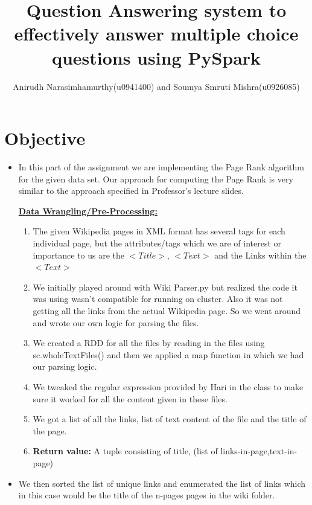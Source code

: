 \documentclass[11pt]{article}
\title{\textbf{{Question Answering system to effectively answer multiple choice questions using PySpark}}}
\author{Anirudh Narasimhamurthy(u0941400) and Soumya Smruti Mishra(u0926085)}
\begin{document}
\maketitle
\section{Objective}



\begin{itemize}

\item[] In this part of the assignment we are implementing the Page Rank algorithm for the given data set. Our approach for computing the Page Rank is very similar to the approach specified in Professor's lecture slides.

\textbf{\underline{Data Wrangling/Pre-Processing:}}

\begin {enumerate}

\item The given Wikipedia pages in XML format has several tags for each individual page, but the attributes/tags which we are of interest or importance to us are the $<Title>$, $<Text>$ and the Links within the $<Text>$
 
\item We initially played around with Wiki Parser.py but realized the code it was using wasn't compatible for running on cluster. Also it was not getting all the links from the actual Wikipedia page. So we went around and wrote our own logic for parsing the files.

\item We created a RDD for all the files by reading in the files using sc.wholeTextFiles() and then we applied a map function in which we had our parsing logic.

\item We tweaked the regular expression provided by Hari in the class to make sure it worked for all the content given in these files.

\item We got a list of all the links, list of text content of the file and the title of the page. 

\item\textbf{Return value:} A tuple consisting of  title, (list of links-in-page,text-in-page)

\end{enumerate}

\item We then sorted the list of unique links and enumerated the list of links which in this case would be the title of the n-pages pages in the wiki folder.


\end{itemize}
\end{document}
